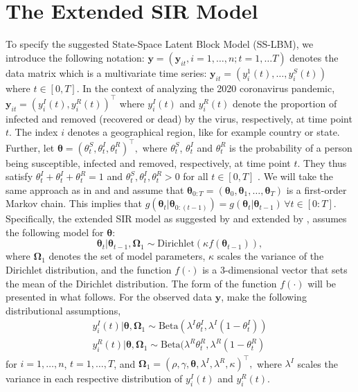 \documentclass[10pt,a4paper]{article}
\begin{document}
\section{The Extended SIR Model}
To specify the suggested State-Space Latent Block Model (SS-LBM), we introduce the following notation: 
%
$
\mathbf{y} = (\mathbf{y}_{it}, i = 1, \ldots, n; t = 1, \ldots T) 
$
%
denotes the data matrix which is a multivariate time series:  
%
$
\mathbf{y}_{it} = (y_{i}^1(t), \ldots, y_{i}^S(t))
$ 
%
where $t \in [0, T]$. In the context of analyzing the 2020 coronavirus pandemic, 
%
$
\mathbf{y}_{it} = (y_{i}^I(t), y_{i}^R(t))^\top
$
%
where $y_{i}^I(t)$ and $y_{i}^R(t)$ denote the proportion of infected and removed (recovered or dead) by the virus, respectively, at time point $t$. The index $i$ denotes a geographical region, like for example country or state. Further, let  
%
$
\boldsymbol{\theta} = (\theta_t^S, \theta_t^I, \theta_t^R)^\top,
$
%
where $\theta_t^S$, $\theta_t^I$ and $\theta_t^R$ is the probability of a person being susceptible, infected and removed, respectively, at time point $t$. They thus satisfy 
%
$
\theta_t^I + \theta_t^I + \theta_t^R = 1
$
% 
and 
%
$
\theta_t^S, \theta_t^I, \theta_t^R > 0
$
%
for all $t \in [0, T]$ \parencite{osthus2017forecasting}. We will take the same approach as in \cite{osthus2017forecasting} and \cite{song2020epidemiological} and assume that 
%
$
\boldsymbol{\theta}_{0:T} = (\boldsymbol{\theta}_0, \boldsymbol{\theta}_1, \ldots, \boldsymbol{\theta}_T)
$
%
is a first-order Markov chain. This implies that 
%
$
g(\boldsymbol{\theta}_t|\boldsymbol{\theta}_{0:(t-1)}) = g(\boldsymbol{\theta}_t|\boldsymbol{\theta}_{t-1}) \, \forall t \in [0:T]. 
$
%
Specifically, the extended SIR model as suggested by \cite{osthus2017forecasting} and extended by \cite{song2020epidemiological}, assumes the following model for $\boldsymbol{\theta}$:
%
$$
\boldsymbol{\theta}_t | \boldsymbol{\theta}_{t-1}, \boldsymbol{\Omega}_1 \sim \text{Dirichlet}(\kappa f(\boldsymbol{\theta}_{t-1})),
$$
where $\boldsymbol{\Omega}_1$ denotes the set of model parameters, $\kappa$ scales the variance of the Dirichlet distribution, and the function $f(\cdot)$ is a 3-dimensional vector that sets the mean of the Dirichlet distribution. The form of the function $f(\cdot)$ will be presented in what follows. For the observed data $\mathbf{y}$, \cite{song2020epidemiological} make the following distributional assumptions,  
%
\begin{equation}\label{statespace}
	\begin{aligned}
		y_{i}^I(t) | \boldsymbol{\theta}, \boldsymbol{\Omega}_1 \sim \text{Beta}(\lambda^I \theta_t^I, \lambda^I(1 - \theta_t^I)) \\
		y_{i}^R(t) | \boldsymbol{\theta}, \boldsymbol{\Omega}_1 \sim \text{Beta}(\lambda^R \theta_t^R, \lambda^R(1 - \theta_t^R)
	\end{aligned}
\end{equation}
%
for 
%
$i=1, \ldots, n$, $t=1, \ldots, T$,
%
and
%
$
\boldsymbol{\Omega}_1 = (\rho, \gamma, \boldsymbol{\theta}, \lambda^I, \lambda^R, \kappa)^\top,
$
%
where $\lambda^I$ scales the variance in each respective distribution of $y_i^I(t)$ and $y_i^R(t)$.
\end{document}
